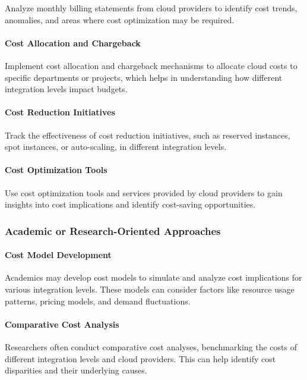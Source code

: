 Analyze monthly billing statements from cloud providers to identify cost trends, anomalies, and areas where cost optimization may be required.

\paragraph{Cost Allocation and Chargeback}

Implement cost allocation and chargeback mechanisms to allocate cloud costs to specific departments or projects, 
which helps in understanding how different integration levels impact budgets.

\paragraph{Cost Reduction Initiatives}

Track the effectiveness of cost reduction initiatives, such as reserved instances, spot instances, or auto-scaling, in different integration levels.

\paragraph{Cost Optimization Tools}

Use cost optimization tools and services provided by cloud providers to gain insights into cost implications and identify cost-saving opportunities.

\subsubsection{Academic or Research-Oriented Approaches}

\paragraph{Cost Model Development}

Academics may develop cost models to simulate and analyze cost implications for various integration levels. 
These models can consider factors like resource usage patterns, pricing models, and demand fluctuations.


\paragraph{Comparative Cost Analysis}

Researchers often conduct comparative cost analyses, benchmarking the costs of different integration levels and cloud providers. 
This can help identify cost disparities and their underlying causes.

